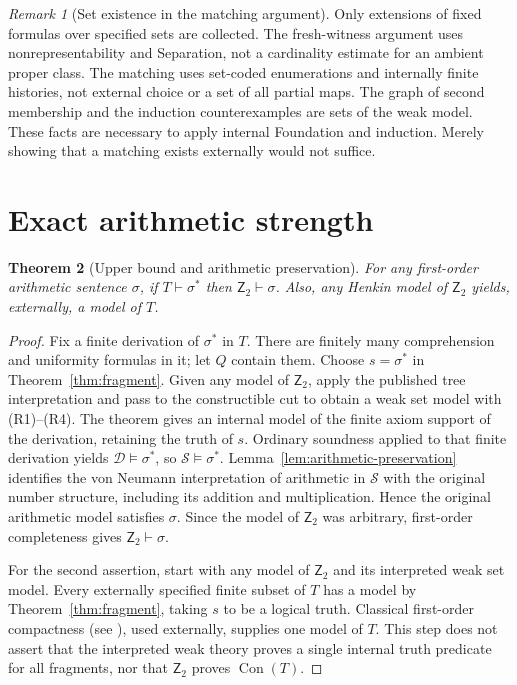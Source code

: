 \documentclass[11pt,a4paper]{article}
\numberwithin{equation}{section}
\newtheorem{theorem}{Theorem}[section]
\theoremstyle{definition}
\theoremstyle{remark}
\newtheorem{remark}[theorem]{Remark}
\newcommand{\Ztwo}{\mathsf{Z}_2}
\newcommand{\Con}{\operatorname{Con}}
\begin{document}
\begin{remark}[Set existence in the matching argument]\label{rem:matching}
Only extensions of fixed formulas over specified sets are collected. The fresh-witness argument uses nonrepresentability and Separation, not a cardinality estimate for an ambient proper class. The matching uses set-coded enumerations and internally finite histories, not external choice or a set of all partial maps. The graph of second membership and the induction counterexamples are sets of the weak model. These facts are necessary to apply internal Foundation and induction. Merely showing that a matching exists externally would not suffice.
\end{remark}

\section{Exact arithmetic strength}\label{sec:exact}
\begin{theorem}[Upper bound and arithmetic preservation]\label{thm:upper}
For any first-order arithmetic sentence $\sigma$, if $T\vdash\sigma^*$ then $\Ztwo\vdash\sigma$. Also, any Henkin model of $\Ztwo$ yields, externally, a model of $T$.
\end{theorem}
\begin{proof}
Fix a finite derivation of $\sigma^*$ in $T$. There are finitely many comprehension and uniformity formulas in it; let $Q$ contain them. Choose $s=\sigma^*$ in Theorem~\ref{thm:fragment}. Given any model of $\Ztwo$, apply the published tree interpretation and pass to the constructible cut to obtain a weak set model with (R1)--(R4). The theorem gives an internal model of the finite axiom support of the derivation, retaining the truth of $s$. Ordinary soundness applied to that finite derivation yields $\mathcal D\models\sigma^*$, so $\mathcal S\models\sigma^*$. Lemma~\ref{lem:arithmetic-preservation} identifies the von Neumann interpretation of arithmetic in $\mathcal S$ with the original number structure, including its addition and multiplication. Hence the original arithmetic model satisfies $\sigma$. Since the model of $\Ztwo$ was arbitrary, first-order completeness gives $\Ztwo\vdash\sigma$.

For the second assertion, start with any model of $\Ztwo$ and its interpreted weak set model. Every externally specified finite subset of $T$ has a model by Theorem~\ref{thm:fragment}, taking $s$ to be a logical truth. Classical first-order compactness (see \cite{enderton}), used externally, supplies one model of $T$. This step does not assert that the interpreted weak theory proves a single internal truth predicate for all fragments, nor that $\Ztwo$ proves $\Con(T)$.
\end{proof}
\end{document}
